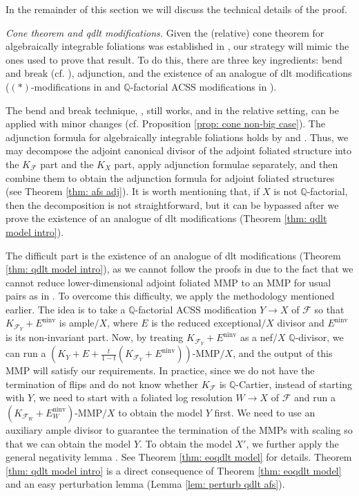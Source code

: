 \documentclass[12pt]{amsart}
\numberwithin{equation}{section}
\newcommand{\Qq}{\mathbb{Q}}
\newcommand{\ninv}{\operatorname{ninv}}
\newcommand{\Ff}{\mathcal{F}}
\theoremstyle{definition}
\theoremstyle{definition}
\theoremstyle{definition}
\begin{document}
In the remainder of this section we will discuss the technical details of the proof.

\smallskip

\noindent\textit{Cone theorem and qdlt modifications.} 
Given the (relative) cone theorem for algebraically integrable foliations was established in \cite{ACSS21,CHLX23}, our strategy will mimic the ones used to prove that result.
To do this, there are three key ingredients: bend and break (cf. \cite[Corollary 2.28]{Spi20}), adjunction, and the existence of an analogue of dlt modifications ($(\ast )$-modifications in \cite{ACSS21} and $\Qq$-factorial ACSS modifications in \cite{CHLX23}).

The bend and break technique, \cite[Corollary 2.28]{Spi20}, still works, and in the relative setting, \cite[Theorem 8.1.1]{CHLX23} can be applied with minor changes (cf. Proposition \ref{prop: cone non-big case}). The adjunction formula for algebraically integrable foliations holds by \cite[Proposition 3.2]{ACSS21} and \cite[Theorem 2.4.1]{CHLX23}. Thus, we may decompose the adjoint canonical divisor of the adjoint foliated structure into the $K_{\Ff}$ part and the $K_X$ part, apply adjunction formulae separately, and then combine them to obtain the adjunction formula for adjoint foliated structures (see Theorem \ref{thm: afs adj}). It is worth mentioning that, if $X$ is not $\Qq$-factorial, then the decomposition is not straightforward, but it can be bypassed after we prove the existence of an analogue of dlt modifications (Theorem \ref{thm: qdlt model intro}).

The difficult part is the existence of an analogue of dlt modifications (Theorem \ref{thm: qdlt model intro}), as we cannot follow the proofs in \cite{ACSS21,CHLX23} due to the fact that we cannot reduce lower-dimensional adjoint foliated MMP to an MMP for usual pairs as in \cite[Proof of Lemma 3.11]{ACSS21}. To overcome this difficulty, we apply the methodology mentioned earlier. The idea is to take a $\Qq$-factorial ACSS modification $Y \rightarrow X$ of $\Ff$ so that $K_{\Ff_Y}+E^{\ninv}$ is ample$/X$, where $E$ is the reduced exceptional$/X$ divisor and $E^{\ninv}$ is its non-invariant part. Now, by treating $K_{\Ff_Y}+E^{\ninv}$ as a nef$/X$ $\Qq$-divisor, we can run a $(K_Y+E+\frac{t}{1-t}(K_{\Ff_Y}+E^{\ninv}))$-MMP$/X$, and the output of this MMP will satisfy our requirements. In practice, since we do not have the termination of flips and do not know whether $K_{\Ff}$ is $\Qq$-Cartier, instead of starting with $Y$, we need to start with a foliated log resolution $W \rightarrow X$ of $\Ff$ and run a $(K_{\Ff_W}+E_W^{\ninv})$-MMP$/X$ to obtain the model $Y$ first. We need to use an auxiliary ample divisor to guarantee the termination of the MMPs with scaling so that we can obtain the model $Y$. To obtain the model $X'$, we further apply the general negativity lemma \cite[Lemma 3.3]{Bir12}. See Theorem \ref{thm: eoqdlt model} for details. Theorem \ref{thm: qdlt model intro} is a direct consequence of Theorem \ref{thm: eoqdlt model} and an easy perturbation lemma (Lemma \ref{lem: perturb qdlt afs}).
\end{document}
